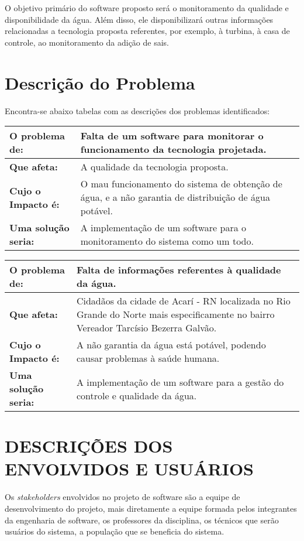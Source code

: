 \documentclass[12pt,openright,oneside,a4paper,brazil]{abntex2}
\begin{document}
O objetivo primário do software proposto será o monitoramento da qualidade e disponibilidade da água. Além disso, ele disponibilizará outras informações relacionadas a tecnologia proposta referentes, por exemplo, à turbina, à casa de controle, ao monitoramento da adição de sais.

\section*{Descrição do Problema}
Encontra-se abaixo tabelas com as descrições dos problemas identificados:
\begin{table}[!t]
\centering
\begin{tabular}{|p{4cm}|p{10cm}|}\hline
\textbf{O problema de:}&Falta de um software para monitorar o funcionamento da tecnologia projetada.\\ \hline
\textbf{Que afeta:}&A qualidade da tecnologia proposta.\\ \hline
\textbf{Cujo o Impacto é:}&	O mau funcionamento do sistema de obtenção de água, e a não garantia de distribuição de água potável.\\ \hline
\textbf{Uma solução seria:}&	A implementação de um software para o monitoramento do sistema como um todo.\\ \hline

\end{tabular}
\end{table}

\begin{table}[!t]
\centering
\begin{tabular}{|p{4cm}|p{10cm}|}\hline
\textbf{O problema de:}&Falta de informações referentes à qualidade da água.\\ \hline
\textbf{Que afeta:}&Cidadãos da cidade de Acarí - RN localizada no Rio Grande do Norte mais especificamente no bairro Vereador Tarcísio Bezerra Galvão.\\ \hline
\textbf{Cujo o Impacto é:}&A não garantia da água está potável, podendo causar problemas à saúde humana.\\ \hline
\textbf{Uma solução seria:}&	A implementação de um software para a gestão do controle e qualidade da água.\\ \hline
\end{tabular}
\end{table}

\section*{DESCRIÇÕES DOS ENVOLVIDOS E USUÁRIOS}
Os \emph{stakeholders} envolvidos no projeto de software são a equipe de desenvolvimento do projeto, mais diretamente a equipe formada pelos integrantes da engenharia de software, os professores da disciplina, os técnicos que serão usuários do sistema, a população que se beneficia do sistema.
\end{document}
